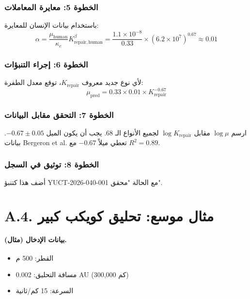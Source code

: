 \documentclass[13pt,a4paper]{article}
\begin{document}
	\subsubsection*{الخطوة 5: معايرة المعاملات}
	باستخدام بيانات الإنسان للمعايرة:
	\[
	\alpha = \frac{\mu_{\mathrm{human}}}{\kappa_c} K_{\mathrm{repair,human}}^{\beta} = \frac{1.1\times 10^{-8}}{0.33} \times (6.2\times 10^7)^{0.67} \approx 0.01
	\]
	
	\subsubsection*{الخطوة 6: إجراء التنبؤات}
	لأي نوع جديد معروف $K_{\mathrm{repair}}$، توقع معدل الطفرة:
	\[
	\mu_{\mathrm{pred}} = 0.33 \times 0.01 \times K_{\mathrm{repair}}^{-0.67}
	\]
	
	\subsubsection*{الخطوة 7: التحقق مقابل البيانات}
	ارسم $\log \mu$ مقابل $\log K_{\mathrm{repair}}$ لجميع الأنواع الـ 68. يجب أن يكون الميل $-0.67 \pm 0.05$. بيانات Bergeron et al. تعطي ميلاً $-0.67$ مع $R^2 = 0.89$.
	
	\subsubsection*{الخطوة 8: توثيق في السجل}
	أضف هذا كتنبؤ YUCT-2026-040-001 مع الحالة "محقق".
	
	
	\section*{A.4. مثال موسع: تحليق كويكب كبير}
	
	\paragraph{بيانات الإدخال (مثال).}
	\begin{itemize}[leftmargin=*]
		\item القطر: 500 م
		\item مسافة التحليق: 0.002 AU (300,000 كم)
		\item السرعة: 15 كم/ثانية
	\end{itemize}
	
\end{document}
